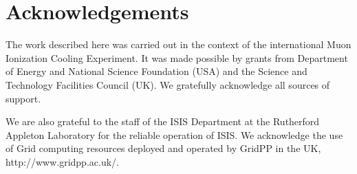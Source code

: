 \section{Acknowledgements}
\label{sec:Acknowledgements}

The work described here was carried out in the context of the international Muon Ionization Cooling Experiment. It was made possible by grants from Department of Energy and National Science Foundation (USA) and the Science and Technology Facilities Council (UK). We gratefully acknowledge all sources of support.

We are also grateful to the staff of the ISIS Department at the Rutherford Appleton Laboratory for the reliable operation of ISIS. We acknowledge the use of Grid computing resources deployed and operated by GridPP in the UK, http://www.gridpp.ac.uk/.
